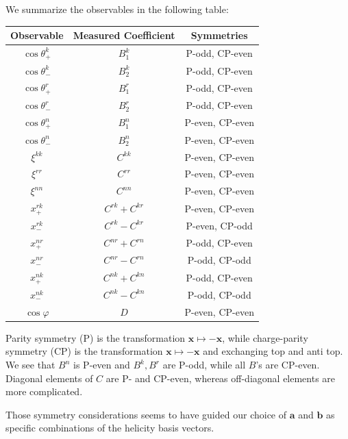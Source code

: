 We summarize the observables in the following table:
\begin{center}
    \begin{longtable}{|c|c|c|}
        \hline
        Observable & Measured Coefficient & Symmetries \\
        \hline
        $\cos \theta_+^k$ & $B_1^k$ & P-odd, CP-even \\
        $\cos \theta_-^k$ & $B_2^k$ & P-odd, CP-even \\
        $\cos \theta_+^r$ & $B_1^r$ & P-odd, CP-even \\
        $\cos \theta_-^r$ & $B_2^r$ & P-odd, CP-even \\
        $\cos \theta_+^n$ & $B_1^n$ & P-even, CP-even \\
        $\cos \theta_-^n$ & $B_2^n$ & P-even, CP-even \\
        \hline
        $\xi^{kk}$ & $C^{kk}$ & P-even, CP-even \\
        $\xi^{rr}$ & $C^{rr}$ & P-even, CP-even \\
        $\xi^{nn}$ & $C^{nn}$ & P-even, CP-even \\
        \hline
        $x_+^{rk}$ & $C^{rk} + C^{kr}$ & P-even, CP-even \\
        $x_-^{rk}$ & $C^{rk} - C^{kr}$ & P-even, CP-odd \\
        $x_+^{nr}$ & $C^{nr} + C^{rn}$ & P-odd, CP-even \\
        $x_-^{nr}$ & $C^{nr} - C^{rn}$ & P-odd, CP-odd \\
        $x_+^{nk}$ & $C^{nk} + C^{kn}$ & P-odd, CP-even \\
        $x_-^{nk}$ & $C^{nk} - C^{kn}$ & P-odd, CP-odd \\
        \hline
        $\cos \varphi$ & $D$ & P-even, CP-even \\
        \hline
    \end{longtable}
\end{center}
\begin{remark}
    Parity symmetry (P) is the transformation $\mathbf{x} \mapsto -\mathbf{x}$, while charge-parity symmetry (CP) is the transformation $\mathbf{x} \mapsto -\mathbf{x}$ and exchanging top and anti top. \followup We see that $B^n$ is P-even and $B^{k}, B^{r}$ are P-odd, while all $B$'s are CP-even. Diagonal elements of $C$ are P- and CP-even, whereas off-diagonal elements are more complicated. 

    Those symmetry considerations seems to have guided our choice of $\mathbf{a}$ and $\mathbf{b}$ as specific combinations of the helicity basis vectors. \followup
\end{remark}

